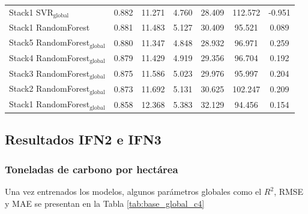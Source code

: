 \begin{table}
{\begin{tabular}{p{4.5cm}cccccc}
        Stack1 SVR$_{\text{global}}$ & 0.882 & 11.271 & 4.760 & 28.409 & 112.572 & -0.951 \\
        Stack1 RandomForest & 0.881 & 11.483 & 5.127 & 30.409 & 95.521 & 0.089 \\
        Stack5 RandomForest$_{\text{global}}$ & 0.880 & 11.347 & 4.848 & 28.932 & 96.971 & 0.259 \\
        Stack4 RandomForest$_{\text{global}}$ & 0.879 & 11.429 & 4.919 & 29.356 & 96.704 & 0.192 \\
        Stack3 RandomForest$_{\text{global}}$ & 0.875 & 11.586 & 5.023 & 29.976 & 95.997 & 0.204 \\
        Stack2 RandomForest$_{\text{global}}$ & 0.873 & 11.692 & 5.131 & 30.625 & 102.247 & 0.209 \\
        Stack1 RandomForest$_{\text{global}}$ & 0.858 & 12.368 & 5.383 & 32.129 & 94.456 & 0.154 \\
            \bottomrule
    \end{tabular}
    }
\end{table}

\subsection{Resultados IFN2 e IFN3}


\subsubsection{Toneladas de carbono por hectárea}


Una vez entrenados los modelos, algunos parámetros globales como el $R^2$, RMSE y MAE se presentan en la Tabla \ref{tab:base_global_c4}

